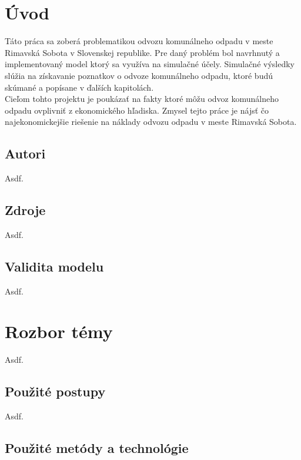 \documentclass[11pt,a4paper]{article}
\begin{document}

\setlength{\parskip}{0pt}
\hypersetup{hidelinks}\tableofcontents
\setlength{\parskip}{0pt}

\newpage %

\section{Úvod}

    Táto práca sa zoberá problematikou odvozu komunálneho odpadu v meste Rimavská Sobota v Slovenskej republike. Pre daný problém bol navrhnutý a implementovaný model ktorý sa využíva na simulačné účely. Simulačné výsledky slúžia na získavanie poznatkov o odvoze komunálneho odpadu, ktoré budú skúmané a popísane v ďalších kapitolách.\\[0.4em]
    Cieľom tohto projektu je poukázať na fakty ktoré môžu odvoz komunálneho odpadu ovplivniť z ekonomického hľadiska. Zmysel tejto práce je nájsť čo najekonomickejšie riešenie na náklady odvozu odpadu v meste Rimavská Sobota.

    \subsection{Autori}
        Asdf.

    \subsection{Zdroje}
        Asdf.

    \subsection{Validita modelu}
        Asdf.

\section{Rozbor témy}

    Asdf.

    \subsection{Použité postupy}

        Asdf.

    \subsection{Použité metódy a technológie}
\end{document}
